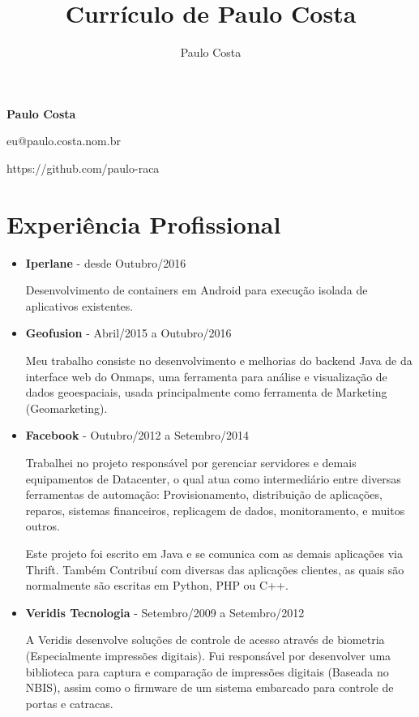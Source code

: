 \documentclass[a4paper,10pt]{article}
\title{Currículo de Paulo Costa}
\author{Paulo Costa}
\begin{document}
  
  \LARGE\textbf{Paulo Costa}

  \large eu@paulo.costa.nom.br

  \large https://github.com/paulo-raca
  


  \normalsize 

  \section{Experiência Profissional}
    \begin{itemize}
      \item
        \textbf{Iperlane} - desde Outubro/2016

        Desenvolvimento de containers em Android para execução isolada de aplicativos existentes.

      \item
        \textbf{Geofusion} - Abril/2015 a Outubro/2016

        Meu trabalho consiste no desenvolvimento e melhorias do backend Java de da interface web do Onmaps, uma ferramenta para análise e visualização de dados geoespaciais, usada principalmente como ferramenta de Marketing (Geomarketing).

      \item
        \textbf{Facebook} - Outubro/2012 a Setembro/2014
        
        Trabalhei no projeto responsável por gerenciar servidores e demais equipamentos de Datacenter, o qual atua como intermediário entre diversas ferramentas de automação: Provisionamento, distribuição de aplicações, reparos, sistemas financeiros, replicagem de dados, monitoramento, e muitos outros.
        
        Este projeto foi escrito em Java e se comunica com as demais aplicações via Thrift. Também Contribuí com diversas das aplicações clientes, as quais são normalmente são escritas em Python, PHP ou C++.

      \item
        \textbf{Veridis Tecnologia} - Setembro/2009 a Setembro/2012

        A Veridis desenvolve soluções de controle de acesso através de biometria (Especialmente impressões digitais). Fui responsável por desenvolver uma biblioteca para captura e comparação de impressões digitais (Baseada no NBIS), assim como o firmware de um sistema embarcado para controle de portas e catracas.
        

\end{itemize}
\end{document}
